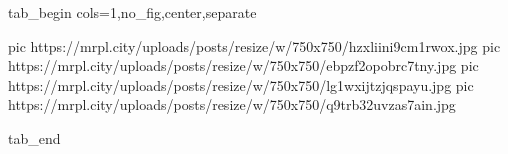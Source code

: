  
 
 
 
 


\ifcmt
  tab_begin cols=1,no_fig,center,separate

     pic https://mrpl.city/uploads/posts/resize/w/750x750/hzxliini9cm1rwox.jpg
     pic https://mrpl.city/uploads/posts/resize/w/750x750/ebpzf2opobrc7tny.jpg
     pic https://mrpl.city/uploads/posts/resize/w/750x750/lg1wxijtzjqspayu.jpg
     pic https://mrpl.city/uploads/posts/resize/w/750x750/q9trb32uvzas7ain.jpg

  tab_end
\fi
